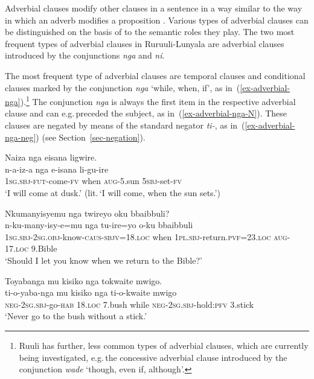 Adverbial clauses modify other clauses in a sentence in a way similar to the way in which an adverb modifies a proposition \citet[:237]{Thompsonetal2007Adverbial}. 
Various types of adverbial clauses can be distinguished on the basis of to the semantic roles they play. 
The two most frequent types of adverbial clauses in Ru\-ruu\-li\hyp{}Lu\-nya\-la are adverbial clauses introduced by the conjunctions \emph{nga} and \emph{ni}.

The most frequent type of adverbial clauses are temporal clauses and conditional clauses marked by the conjunction \textit{nga} `while, when, if', as in~(\ref{ex-adverbial-nga}).\footnote{Ruuli has further, less common types of adverbial clauses, which are currently being investigated, e.g.\,the concessive adverbial clause introduced by the conjunction \emph{wade} `though, even if, although'.}
The conjunction \textit{nga} is always the first item in the respective adverbial clause and can e.g.\,preceded the subject, as in~(\ref{ex-adverbial-nga-N}).
These clauses are negated by means of the standard negator \emph{ti-}, as in~(\ref{ex-adverbial-nga-neg}) (see Section~\ref{sec-negation}).

\ea \label{ex-adverbial-nga}
\begin{xlist}

\ex \label{ex-adverbial-nga-N}
    \glll   Naiza nga eisana ligwire.\\
        n-a-iz-a nga e-isana li-gu-ire\\
        1\textsc{sg.sbj}-\textsc{fut}-come-\textsc{fv}	when	\textsc{aug}-5.sun 	\textsc{5sbj}-set-\textsc{fv}\\
    \glt `I will come at dusk.' (lit.\,`I will come, when the sun sets.')
	
\ex
    \glll   Nkumanyisyemu 				nga 	twireyo 			oku 		bbaibbuli?\\
        n-ku-many-isy-e=mu			nga	tu-ire=yo			o-ku		bbaibbuli\\
        1\textsc{sg.sbj}-2\textsc{sg.obj}-know-\textsc{caus}-\textsc{sbjv}=18.\textsc{loc}	when	1\textsc{pl.sbj}-return.\textsc{pvf}=23.\textsc{loc}	\textsc{aug}-17.\textsc{loc}	9.Bible\\
    \glt `Should I let you know when we return to the Bible?'

\ex \label{ex-adverbial-nga-neg}
    \glll Toyabanga mu kisiko nga tokwaite mwigo.\\
         ti-o-yaba-nga mu kisiko nga ti-o-kwaite 	        	mwigo\\
	   \textsc{neg}-2\textsc{sg.sbj}-go-\textsc{hab} 18.\textsc{loc}	7.bush	while \textsc{neg}-2\textsc{sg.sbj}-hold:\textsc{pfv} 3.stick\\
	\glt ‘Never go to the bush without a stick.’
\end{xlist}
\z

